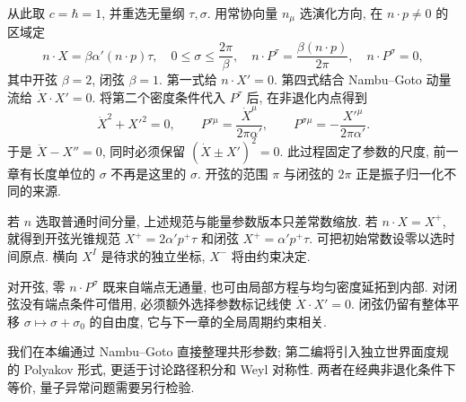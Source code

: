 从此取 $c=\hbar=1$, 并重选无量纲 $\tau,\sigma$. 用常协向量 $n_\mu$ 选演化方向, 在 $n\cdot p\ne0$ 的区域定
\[
 n\cdot X=\beta\alpha'(n\cdot p)\tau,
 \quad 0\leq\sigma\leq\frac{2\pi}{\beta},
 \quad n\cdot P^\tau=\frac{\beta(n\cdot p)}{2\pi},
 \quad n\cdot P^\sigma=0,
\]
其中开弦 $\beta=2$, 闭弦 $\beta=1$. 第一式给 $n\cdot X'=0$. 第四式结合 Nambu--Goto 动量流给 $\dot X\cdot X'=0$. 将第二个密度条件代入 $P^\tau$ 后, 在非退化内点得到
\[
 \dot X^2+X'^2=0,\qquad
 P^{\tau\mu}=\frac{\dot X^\mu}{2\pi\alpha'},
 \qquad P^{\sigma\mu}=-\frac{X'^\mu}{2\pi\alpha'}.
\]
于是 $\ddot X-X''=0$, 同时必须保留 $(\dot X\pm X')^2=0$. 此过程固定了参数的尺度, 前一章有长度单位的 $\sigma$ 不再是这里的 $\sigma$. 开弦的范围 $\pi$ 与闭弦的 $2\pi$ 正是振子归一化不同的来源.

若 $n$ 选取普通时间分量, 上述规范与能量参数版本只差常数缩放. 若 $n\cdot X=X^+$, 就得到开弦光锥规范 $X^+=2\alpha'p^+\tau$ 和闭弦 $X^+=\alpha'p^+\tau$. 可把初始常数设零以选时间原点. 横向 $X^I$ 是待求的独立坐标, $X^-$ 将由约束决定.

对开弦, 零 $n\cdot P^\sigma$ 既来自端点无通量, 也可由局部方程与均匀密度延拓到内部. 对闭弦没有端点条件可借用, 必须额外选择参数标记线使 $\dot X\cdot X'=0$. 闭弦仍留有整体平移 $\sigma\mapsto\sigma+\sigma_0$ 的自由度, 它与下一章的全局周期约束相关.

我们在本编通过 Nambu--Goto 直接整理共形参数; 第二编将引入独立世界面度规的 Polyakov 形式, 更适于讨论路径积分和 Weyl 对称性. 两者在经典非退化条件下等价, 量子异常问题需要另行检验.
